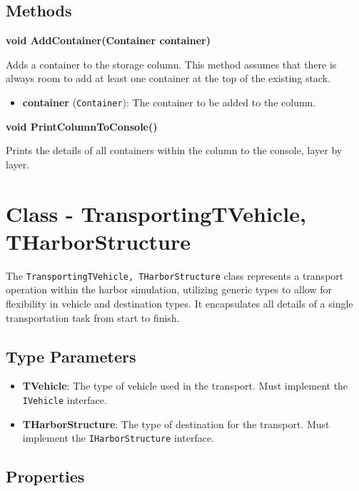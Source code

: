 \documentclass[12pt]{article}
\begin{document}
\subsection*{Methods}

\textbf{void AddContainer(Container container)}

Adds a container to the storage column. This method assumes that there is always room to add at least one container at the top of the existing stack.

\begin{itemize}
    \item \textbf{container} (\texttt{Container}): The container to be added to the column.
\end{itemize}

\textbf{void PrintColumnToConsole()}

Prints the details of all containers within the column to the console, layer by layer.

\newpage
\section*{Class - Transporting\textlangle{}TVehicle, THarborStructure\textrangle{}}

The \texttt{Transporting\textlangle{}TVehicle, THarborStructure\textrangle{}} class represents a transport operation within the harbor simulation, utilizing generic types to allow for flexibility in vehicle and destination types. It encapsulates all details of a single transportation task from start to finish.

\subsection*{Type Parameters}

\begin{itemize}
    \item \textbf{TVehicle}: The type of vehicle used in the transport. Must implement the \texttt{IVehicle} interface.
    \item \textbf{THarborStructure}: The type of destination for the transport. Must implement the \texttt{IHarborStructure} interface.
\end{itemize}

\subsection*{Properties}
\end{document}
